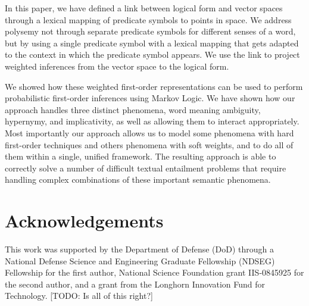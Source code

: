 In this paper, we have defined a link between logical form and vector
spaces through a lexical mapping of predicate symbols to points in
space. We address polysemy not through separate predicate symbols for
different senses of a word, but by using a single predicate symbol
with a lexical mapping that gets
adapted to the context in which the predicate symbol appears. We use
the link to project weighted inferences from the vector space to the
logical form. 

We showed how these weighted first-order
representations can be used to perform probabilistic first-order inferences
using Markov Logic.  We have shown how our approach handles three distinct
phenomena, word meaning ambiguity, hypernymy, and implicativity, as well as
allowing them to interact appropriately.  Most importantly our approach allows 
us to model some phenomena with hard first-order techniques and
others phenomena with soft weights, and to do all of them within a
single, unified framework.
The resulting approach is able to correctly solve a number of difficult
textual entailment problems that require handling complex combinations of these
important semantic phenomena.




\section*{Acknowledgements}

This work was supported by the Department of Defense (DoD) through a
National Defense Science and Engineering Graduate Fellowship (NDSEG) Fellowship
for the first author, National Science Foundation grant IIS-0845925 for the
second author, and a grant from the Longhorn Innovation Fund for Technology.
[TODO: Is all of this right?]
